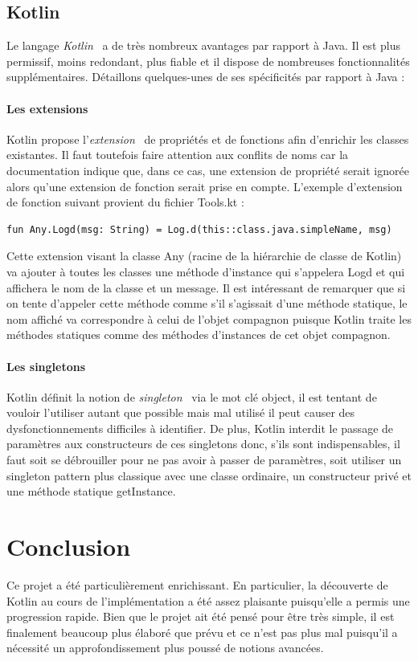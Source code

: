 \documentclass{article}
\begin{document}
\subsection{Kotlin}
Le langage \textit{Kotlin}~\cite{kotlinDoc} a de très nombreux avantages par rapport à Java. Il est plus permissif, moins redondant, plus fiable et il dispose de nombreuses fonctionnalités supplémentaires. Détaillons quelques-unes de ses spécificités par rapport à Java :

\paragraph{Les extensions}
Kotlin propose l'\textit{extension}~\cite{extensionDoc} de propriétés et de fonctions afin d'enrichir les classes existantes.
Il faut toutefois faire attention aux conflits de noms car la documentation indique que, dans ce cas, une extension de propriété serait ignorée alors qu'une extension de fonction serait prise en compte. L'exemple d'extension de fonction suivant provient du fichier Tools.kt :
\begin{verbatim}
fun Any.Logd(msg: String) = Log.d(this::class.java.simpleName, msg)
\end{verbatim}
Cette extension visant la classe Any (racine de la hiérarchie de classe de Kotlin) va ajouter à toutes les classes une méthode d'instance qui s'appelera Logd et qui affichera le nom de la classe et un message. Il est intéressant de remarquer que si on tente d'appeler cette méthode comme s'il s'agissait d'une méthode statique, le nom affiché va correspondre à celui de l'objet compagnon puisque Kotlin traite les méthodes statiques comme des méthodes d'instances de cet objet compagnon.

\paragraph{Les singletons}
Kotlin définit la notion de \textit{singleton}~\cite{singletonDoc} via le mot clé object, il est tentant de vouloir l’utiliser autant que possible mais mal utilisé il peut causer des dysfonctionnements difficiles à identifier. De plus, Kotlin interdit le passage de paramètres aux constructeurs de ces singletons donc, s’ils sont indispensables, il faut soit se débrouiller pour ne pas avoir à passer de paramètres, soit utiliser un singleton pattern plus classique avec une classe ordinaire, un constructeur privé et une méthode statique getInstance. 

\section*{Conclusion}
Ce projet a été particulièrement enrichissant. En particulier, la découverte de Kotlin au cours de l'implémentation a été assez plaisante puisqu'elle a permis une progression rapide. Bien que le projet ait été pensé pour être très simple, il est finalement beaucoup plus élaboré que prévu et ce n’est pas plus mal puisqu’il a nécessité un approfondissement plus poussé de notions avancées.
\end{document}
